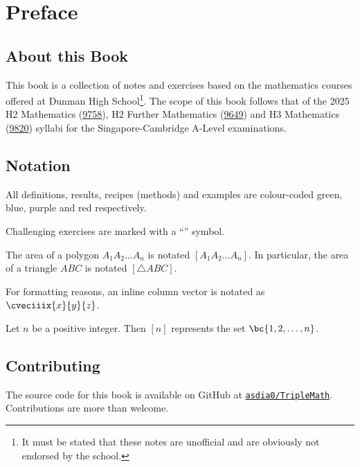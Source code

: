 \chapter*{Preface}

\section*{About this Book}

This book is a collection of notes and exercises based on the mathematics courses offered at Dunman High School\footnote{It must be stated that these notes are unofficial and are obviously not endorsed by the school.}. The scope of this book follows that of the 2025 H2 Mathematics (\href{https://www.seab.gov.sg/files/A%20Level%20Syllabus%20Sch%20Cddts/2025/8865_y25_sy.pdf}{9758}), H2 Further Mathematics (\href{https://www.seab.gov.sg/files/A%20Level%20Syllabus%20Sch%20Cddts/2025/9649_y25_sy.pdf}{9649}) and H3 Mathematics (\href{https://www.seab.gov.sg/files/A%20Level%20Syllabus%20Sch%20Cddts/2025/9820_y25_sy.pdf}{9820}) syllabi for the Singapore-Cambridge A-Level examinations.

\section*{Notation}

All definitions, results, recipes (methods) and examples are colour-coded green, blue, purple and red respectively. 

Challenging exercises are marked with a ``\chili'' symbol.

The area of a polygon $A_1 A_2 \dots A_n$ is notated $[A_1 A_2 \dots A_n]$. In particular, the area of a triangle $ABC$ is notated $[\triangle ABC]$.

For formatting reasons, an inline column vector is notated as $\cveciiix{x}{y}{z}$.

Let $n$ be a positive integer. Then $[n]$ represents the set $\bc{1, 2, \dots, n}$.

\section*{Contributing}

The source code for this book is available on GitHub at \href{https://github.com/asdia0/TripleMath}{\texttt{asdia0/TripleMath}}. Contributions are more than welcome.